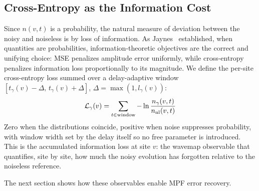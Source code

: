 \documentclass[letterpaper]{article}
\begin{document}
\subsection{Cross-Entropy as the Information Cost}

Since $n(v,t)$ is a probability, the natural measure of deviation
between the noisy and noiseless is by loss of information.  As
Jaynes~\cite{Jaynes1957PartI,Jaynes1957PartII} established, when
quantities are probabilities, information-theoretic objectives are the
correct and unifying choice: MSE penalizes amplitude error uniformly,
while cross-entropy penalizes information loss proportionally to its
magnitude.  We define the per-site cross-entropy loss summed over a
delay-adaptive window $[t_\gamma(v)-\Delta,\,t_\gamma(v)+\Delta]$,
$\Delta = \max(1,l_\gamma(v))$:
\begin{equation}
    \mathcal{L}_\gamma(v) = \sum_{t \in \text{window}}
    -\ln \frac{n_\gamma(v,t)}{n_{\rm nl}(v,t)}
    \label{eq:loss}
\end{equation}
Zero when the distributions coincide, positive when noise suppresses
probability, with window width set by the delay itself so no free
parameter is introduced.  This is the accumulated information loss at
site $v$: the wavemap observable that quantifies, site by site, how
much the noisy evolution has forgotten relative to the noiseless
reference.

The next section shows how these observables enable MPF error recovery.
\end{document}
